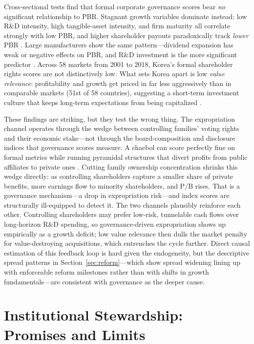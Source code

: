 \documentclass[12pt]{article}
\begin{document}
Cross-sectional tests find that formal corporate governance scores bear \emph{no} significant relationship to PBR. Stagnant growth variables dominate instead: low R\&D intensity, high tangible-asset intensity, and firm maturity all correlate strongly with low PBR, and higher shareholder payouts paradoxically track \emph{lower} PBR \citep{yang2025korea}. Large manufacturers show the same pattern---dividend expansion has weak or negative effects on PBR, and R\&D investment is the more significant predictor \citep{lee2025korea_pbr}. Across 58 markets from 2001 to 2018, Korea's formal shareholder rights scores are not distinctively low. What sets Korea apart is low \emph{value relevance}: profitability and growth get priced in far less aggressively than in comparable markets (51st of 58 countries), suggesting a short-term investment culture that keeps long-term expectations from being capitalized \citep{kim2025causes}.

These findings are striking, but they test the wrong thing. The expropriation channel operates through the wedge between controlling families' voting rights and their economic stake---not through the board-composition and disclosure indices that governance scores measure. A chaebol can score perfectly fine on formal metrics while running pyramidal structures that divert profits from public affiliates to private ones \citep{almeida2011chaebol}. Cutting family ownership concentration shrinks this wedge directly: as controlling shareholders capture a smaller share of private benefits, more earnings flow to minority shareholders, and P/B rises. That is a governance mechanism---a drop in expropriation risk---and index scores are structurally ill-equipped to detect it. The two channels plausibly reinforce each other. Controlling shareholders may prefer low-risk, tunnelable cash flows over long-horizon R\&D spending, so governance-driven expropriation shows up empirically as a growth deficit; low value relevance then dulls the market penalty for value-destroying acquisitions, which entrenches the cycle further. Direct causal estimation of this feedback loop is hard given the endogeneity, but the descriptive spread patterns in Section~\ref{sec:reform}---which show spread widening lining up with enforceable reform milestones rather than with shifts in growth fundamentals---are consistent with governance as the deeper cause.

\section{Institutional Stewardship: Promises and Limits}
\label{sec:stewardship}
\end{document}
